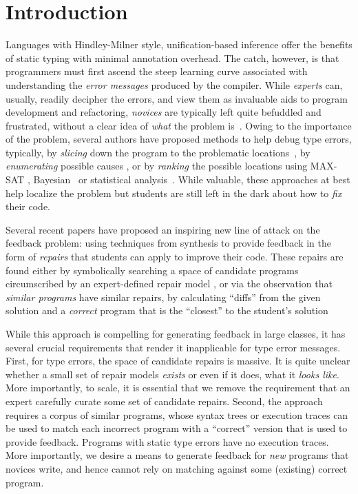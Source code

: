 \section{Introduction}
\label{sec:intro}

%
Languages with Hindley-Milner style, unification-based inference offer the
benefits of static typing with minimal annotation overhead. The catch, however,
is that programmers must first ascend the steep learning curve associated with
understanding the \emph{error messages} produced by the compiler.
%
While \emph{experts} can, usually, readily decipher the errors, and view them as
invaluable aids to program development and refactoring, \emph{novices} are
typically left quite befuddled and frustrated, without a clear idea of
\emph{what} the problem is~\citep{Wand1986-nw}.
%
Owing to the importance of the problem, several authors have proposed methods to
help debug type errors, typically, by \emph{slicing} down the program to the
problematic locations~\citep{Haack2003-vc, Rahli2015-tt}, by \emph{enumerating}
possible causes \citep{Lerner2007-dt, Chen2014-gd}, or by \emph{ranking} the
possible locations using MAX-SAT \citep{Pavlinovic2014-mr},
Bayesian~\citep{Zhang2014-lv} or statistical analysis~\citep{Seidel:2017}.
%
While valuable, these approaches at best help localize the problem but students
are still left in the dark about how to \emph{fix} their code.

%
Several recent papers have proposed an inspiring new line of
attack on the feedback problem: using techniques from synthesis
to provide feedback in the form of \emph{repairs} that students
can apply to improve their code.
%
These repairs are found either by symbolically searching a space of candidate
programs circumscribed by an expert-defined repair model
\citep{singh2013,HeadGSSFDH17}, or via the observation that \emph{similar
programs} have similar repairs, \ie by calculating ``diffs'' from the given
solution and a \emph{correct} program that is the ``closest'' to the student's
solution ~\citep{Gulwani_2018,Wang_2018}

While this approach is compelling for generating feedback in large
classes, it has several crucial requirements that render it inapplicable
for type error messages.
%
First, for type errors, the space of candidate repairs is massive.
It is quite unclear whether a small set of repair models \emph{exists}
or even if it does, what it \emph{looks like}. More importantly,
to scale, it is essential that we remove the requirement that an
expert carefully curate some set of candidate repairs.
%
Second, the approach requires a corpus of similar programs,
whose syntax trees or execution traces can be used to match
each incorrect program with a ``correct'' version that is
used to provide feedback. Programs with static type errors
have no execution traces.
%
More importantly, we desire a means to generate feedback
for \emph{new} programs that novices write, and hence
cannot rely on matching against some (existing) correct
program.

